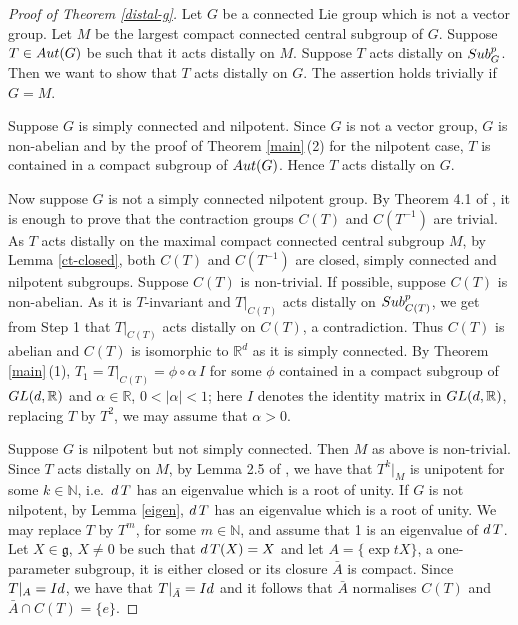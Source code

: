 \documentclass{amsart}
\numberwithin{equation}{section}
\newcommand{\Aut}{{\rm Aut}}
\newcommand{\N}{{\mathbb N}}
\newcommand{\R}{{\mathbb R}}
\newcommand{\gf}{{\mathfrak g}}
\newcommand{\spg}{{\rm Sub}^p_G}
\newcommand{\spp}{{\rm Sub}^{p}}
\newcommand{\du}{{\rm d\,}}
\newcommand{\Id}{{\rm Id}}
\newcommand{\GL}{{\rm GL}}
\let\ap=\alpha
\theoremstyle{remark}
\begin{document}
\begin{proof}[Proof of Theorem {\rm\ref{distal-g}}]  Let $G$ be a connected Lie group which is not a vector group. 
Let $M$ be the largest compact connected central subgroup of $G$. Suppose 
$T\in\Aut(G)$ be such that it acts distally on $M$. Suppose $T$ acts distally on $\spg$. 
Then we want to show that $T$ acts distally on $G$. The assertion holds trivially if $G=M$. 

\smallskip
{} Suppose $G$ is simply connected and nilpotent. Since $G$ is not a vector group, 
$G$ is non-abelian and by the proof of Theorem \ref{main}\,(2) for the nilpotent case, $T$ is contained in 
a compact subgroup of $\Aut(G)$. Hence $T$ acts distally on $G$. 

\smallskip
{} Now suppose $G$ is not a simply connected nilpotent group.
 By Theorem 4.1 of \cite{RS2}, 
it is enough to prove that the contraction groups $C(T)$ and $C(T^{-1})$ are trivial. As $T$ acts distally on the 
maximal compact connected central subgroup $M$, by Lemma \ref{ct-closed}, both 
$C(T)$ and $C(T^{-1})$ are closed, simply connected and nilpotent subgroups. Suppose $C(T)$ is non-trivial. 
If possible, suppose $C(T)$ is non-abelian. As it is $T$-invariant and $T|_{C(T)}$ acts distally on $\spp_{C(T)}$, 
we get from Step 1 that $T|_{C(T)}$ acts distally on $C(T)$, a contradiction. Thus $C(T)$ is abelian and 
 $C(T)$ is isomorphic to $\R^d$ as it is simply connected. By Theorem \ref{main}\,(1),
 $T_1=T|_{C(T)}=\phi\circ \ap\,I$ for 
 some $\phi$ contained in a compact subgroup of $\GL(d,\R)$ and $\ap\in \R$, $0< |\ap|<1$; here $I$ denotes the 
 identity matrix in $\GL(d,\R)$, replacing $T$ by $T^2$, we may assume that $\ap>0$.

\smallskip
{} Suppose $G$ is nilpotent but not simply connected. Then $M$ as above is non-trivial. Since $T$ acts 
distally on $M$, by Lemma 2.5 of \cite{Ab2}, we have that $T^k|_M$ is unipotent for some $k\in\N$, i.e.\ $\du T$ has an 
eigenvalue which is a root of unity. If $G$ is not nilpotent, by Lemma \ref{eigen}, $\du T$  has an eigenvalue which is a 
root of unity. We may replace $T$ by $T^m$, for some $m\in\N$, and assume that 1 is an eigenvalue of $\du T$. 
Let $X\in \gf$, $X\ne 0$ be such that $\du T(X)=X$ and let $A=\{\exp tX\}$, a one-parameter 
subgroup, it is either closed or its closure $\bar A$ is compact. Since  $T|_A=\Id$, we have that 
$T|_{\bar A}=\Id$ and it follows that $\bar A$ normalises $C(T)$ and $\bar A\cap C(T)=\{e\}$. 


\end{proof}
\end{document}
